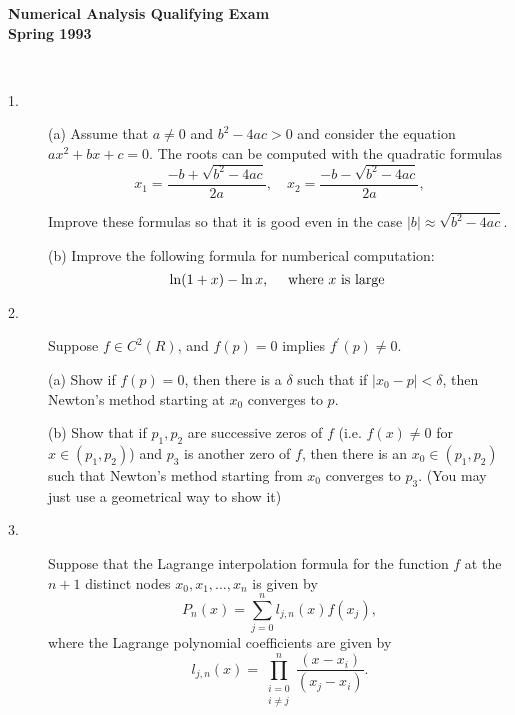 \documentclass{article}
\begin{document}






\begin{center}\begin{LARGE}
{\bf Numerical Analysis Qualifying Exam}\\ 
{\bf Spring 1993}\\ \end{LARGE}
\end{center}
\vspace{0.1in}
\noindent\hrulefill\\

\begin{description}
\item[1.] (a)
Assume that $a \neq 0$ and $b^2 - 4ac > 0$ and consider the equation
$ax^2 + bx + c = 0$. The roots can be computed with the quadratic formulas
$$x_1 = \frac{-b + \sqrt{b^2 - 4ac}}{2a}, \quad
  x_2 = \frac{-b - \sqrt{b^2 - 4ac}}{2a},$$

Improve these formulas so that it is good even in the case
$|b| \approx \sqrt{b^2 - 4ac}$.

\item[\quad] (b)
Improve the following formula for numberical computation:
$$\ln (1+x) - \ln x, \quad \hbox{\ where\ } x \hbox{\ is\ } \hbox{large\ }$$

\item[2.]
Suppose $f \in C^2(R)$, and $f(p) = 0$ implies $f^\prime (p) \neq 0$.

\item[\quad] (a)
Show if $f(p) = 0$, then there is a $\delta$ such that if $|x_0 -p| < \delta$,
then Newton's method starting at $x_0$ converges to $p$.

\item[\quad] (b)
Show that if $p_1, p_2$ are successive zeros of $f$ (i.e. $f(x) \neq 0$
for $x \in (p_1, p_2)$) and $p_3$ is another zero of $f$, then there is an
$x_0 \in (p_1, p_2)$ such that Newton's method starting from $x_0$
converges to $p_3$. (You may just use a geometrical way to show it)

\item[3.]
Suppose that the Lagrange interpolation formula for the function $f$ at
the $n+1$ distinct nodes $x_0, x_1, \dots, x_n$ is given by
$$P_n(x) = \sum^n_{j=0} l_{j,n} (x) f(x_j),$$
where the Lagrange polynomial coefficients are given by
$$l_{j,n} (x) = \prod^n_{\substack{ i=0 \\ i \neq j}}
  \frac{(x-x_i)}{(x_j - x_i)}.$$


\end{description}
\end{document}
